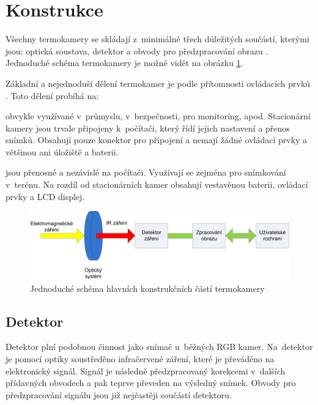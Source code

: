 \section{Konstrukce}
Všechny termokamery se skládají z~minimálně třech důležitých součástí, kterými jsou: optická soustava, detektor a obvody pro předzpracování obrazu \cite{jakl2011experimentalni,smrvz2013bezkontaktni,malik2012zpracovani}. Jednoduché schéma termokamery je možné vidět na obrázku \ref{fig:thermal_camera_scheme}. 

Základní a nejednoduší dělení termokamer je podle přítomnosti ovládacích prvků \cite{kuvzel2010bezkontaktni}. Toto dělení probíhá na:

\begin{description}[align=left]
  \item [Stacionární termokamery] obvykle využívané v~průmyslu, v~bezpečnosti, pro monitoring, apod. Stacionární kamery jsou  trvale připojeny k~počítači, který řídí jejich nastavení a přenos snímků. Obsahují pouze konektor pro připojení a nemají žádné ovládací prvky a většinou ani úložiště a baterii.
  \item [Ruční termokamery] jsou přenosné a nezávislé na počítači. Využívají se zejména pro snímkování v~terénu. Na rozdíl od stacionárních kamer obsahují vestavěnou baterii, ovládací prvky a LCD displej.
\end{description}
    
\begin{figure}[h]
  \centering
  \includegraphics[width=1\textwidth]{images/konstrukce_kamery.png}
  \caption{Jednoduché schéma hlavních konstrukčních částí termokamery \cite{konstrukcetermokamery}}
  \label{fig:thermal_camera_scheme}
\end{figure}
    
    \subsection{Detektor}
    Detektor  plní podobnou činnost jako snímač u~běžných RGB kamer. Na~detektor je pomocí optiky soustředěno infračervené záření, které je převáděno na elektronický signál. Signál je následně předzpracovaný korekcemi v~dalších přídavných obvodech a pak teprve převeden na výsledný snímek. Obvody pro předzpracování signálu jsou již nejčastěji součástí detektoru. \cite{smrvz2013bezkontaktni}
    
